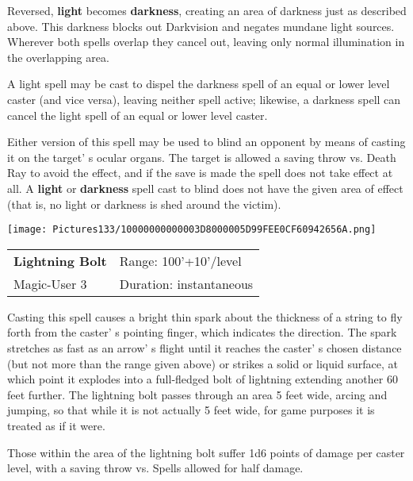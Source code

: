 \documentclass[a4paper,twoside,openany,10pt]{book}
\begin{document}
\begin{multicols}{2}
Reversed, \textbf{light} becomes \textbf{darkness}, creating an area of darkness just as described above. This darkness blocks out Darkvision and negates mundane light sources. Wherever both spells overlap they cancel out, leaving only normal illumination in the overlapping area. 

A light spell may be cast to dispel the darkness spell of an equal or lower level caster (and vice versa), leaving neither spell active; likewise, a darkness spell can cancel the light spell of an equal or lower level caster.

Either version of this spell may be used to blind an opponent by means of casting it on the target' s ocular organs. The target is allowed a saving throw vs. Death Ray to avoid the effect, and if the save is made the spell does not take effect at all. A \textbf{light} or \textbf{darkness} spell cast to blind does not have the given area of effect (that is, no light or darkness is shed around the victim).

\medskip

\begin{flushleft}
\texttt{[image: Pictures133/10000000000003D8000005D99FEE0CF60942656A.png]}
\end{flushleft}

\smallskip\begin{flushleft} 
	\begin{tabularx}{0.45\textwidth}{@{}m{3.5cm}m{5.5cm}@{}} 
		\textbf{Lightning Bolt} & Range: 100'+10'/level\\
Magic-User 3 &Duration: instantaneous\\
	\end{tabularx}\end{flushleft}

Casting this spell causes a bright thin spark about the thickness of a string to fly forth from the caster' s pointing finger, which indicates the direction. The spark stretches as fast as an arrow' s flight until it reaches the caster' s chosen distance (but not more than the range given above) or strikes a solid or liquid surface, at which point it explodes into a full-fledged bolt of lightning extending another 60 feet further. The lightning bolt passes through an area 5 feet wide, arcing and jumping, so that while it is not actually 5 feet wide, for game purposes it is treated as if it were.

Those within the area of the lightning bolt suffer 1d6 points of damage per caster level, with a saving throw vs. Spells allowed for half damage.


\end{multicols}
\end{document}
